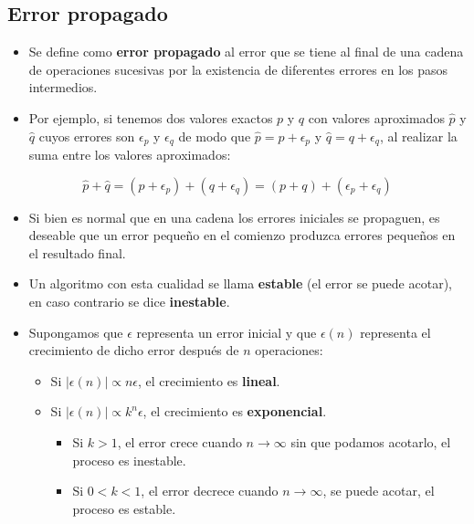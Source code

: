 \documentclass[openany]{book}
\providecommand{\tightlist}{%
  \setlength{\itemsep}{0pt}\setlength{\parskip}{0pt}}
\begin{document}
\hypertarget{error-propagado}{%
\subsection{Error propagado}\label{error-propagado}}

\begin{itemize}
\tightlist
\item
  Se define como \textbf{error propagado} al error que se tiene al final de una cadena de operaciones sucesivas por la existencia de diferentes errores en los pasos intermedios.
\item
  Por ejemplo, si tenemos dos valores exactos \(p\) y \(q\) con valores aproximados \(\hat{p}\) y \(\hat{q}\) cuyos errores son \(\epsilon_p\) y \(\epsilon_q\) de modo que \(\hat{p} = p + \epsilon_p\) y \(\hat{q} = q + \epsilon_q\), al realizar la suma entre los valores aproximados:
\end{itemize}

\[\hat{p} + \hat{q} = (p + \epsilon_p) + (q + \epsilon_q) = (p + q) + (\epsilon_p + \epsilon_q)\]

\begin{itemize}
\item
  Si bien es normal que en una cadena los errores iniciales se propaguen, es deseable que un error pequeño en el comienzo produzca errores pequeños en el resultado final.
\item
  Un algoritmo con esta cualidad se llama \textbf{estable} (el error se puede acotar), en caso contrario se dice \textbf{inestable}.
\item
  Supongamos que \(\epsilon\) representa un error inicial y que \(\epsilon (n)\) representa el crecimiento de dicho error después de \(n\) operaciones:

  \begin{itemize}
  \tightlist
  \item
    Si \(|\epsilon (n)| \propto n \epsilon\), el crecimiento es \textbf{lineal}.
  \item
    Si \(|\epsilon (n)| \propto k^n \epsilon\), el crecimiento es \textbf{exponencial}.

    \begin{itemize}
    \tightlist
    \item
      Si \(k > 1\), el error crece cuando \(n \rightarrow \infty\) sin que podamos acotarlo, el proceso es inestable.
    \item
      Si \(0 < k < 1\), el error decrece cuando \(n \rightarrow \infty\), se puede acotar, el proceso es estable.
    \end{itemize}
  \end{itemize}
\end{itemize}
\end{document}
